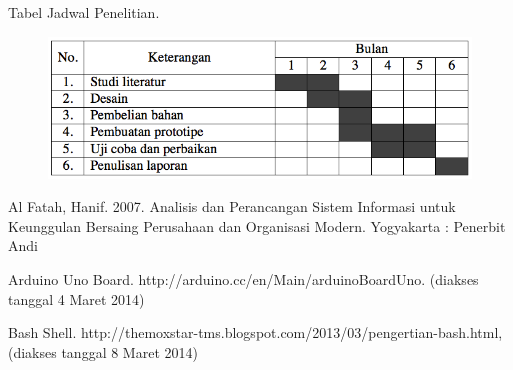 \documentclass{jtetiproposalskripsi}
\begin{document}
\begin{center}
Tabel Jadwal Penelitian.
\end{center}
\vspace{-0.5cm}
\begin{figure}[ht!]
  \centering
    \includegraphics[width=13cm]{gambar/timeline}
\end{figure}


\begin{thebibliography}{9}


Al Fatah, Hanif. 2007. Analisis dan Perancangan Sistem Informasi untuk Keunggulan Bersaing Perusahaan dan Organisasi Modern. Yogyakarta : Penerbit Andi

Arduino Uno Board. http://arduino.cc/en/Main/arduinoBoardUno. (diakses tanggal 4 Maret 2014)

Bash Shell. http://themoxstar-tms.blogspot.com/2013/03/pengertian-bash.html, (diakses tanggal 8 Maret 2014)


\end{thebibliography}
\end{document}
